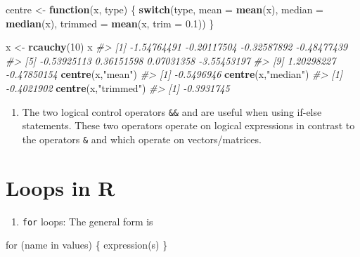 \documentclass[
]{book}
\newenvironment{Shaded}{\begin{snugshade}}{\end{snugshade}}
\newcommand{\AttributeTok}[1]{\textcolor[rgb]{0.13,0.29,0.53}{#1}}
\newcommand{\CommentTok}[1]{\textcolor[rgb]{0.56,0.35,0.01}{\textit{#1}}}
\newcommand{\ControlFlowTok}[1]{\textcolor[rgb]{0.13,0.29,0.53}{\textbf{#1}}}
\newcommand{\DecValTok}[1]{\textcolor[rgb]{0.00,0.00,0.81}{#1}}
\newcommand{\FloatTok}[1]{\textcolor[rgb]{0.00,0.00,0.81}{#1}}
\newcommand{\FunctionTok}[1]{\textcolor[rgb]{0.13,0.29,0.53}{\textbf{#1}}}
\newcommand{\NormalTok}[1]{#1}
\newcommand{\OtherTok}[1]{\textcolor[rgb]{0.56,0.35,0.01}{#1}}
\newcommand{\StringTok}[1]{\textcolor[rgb]{0.31,0.60,0.02}{#1}}
\providecommand{\tightlist}{%
  \setlength{\itemsep}{0pt}\setlength{\parskip}{0pt}}
\begin{document}
\begin{Shaded}
\begin{Highlighting}[]
\NormalTok{centre }\OtherTok{\textless{}{-}} \ControlFlowTok{function}\NormalTok{(x, type) }
\NormalTok{  \{ }\ControlFlowTok{switch}\NormalTok{(type,}
           \AttributeTok{mean =} \FunctionTok{mean}\NormalTok{(x),}
           \AttributeTok{median =} \FunctionTok{median}\NormalTok{(x),}
           \AttributeTok{trimmed =} \FunctionTok{mean}\NormalTok{(x, }\AttributeTok{trim =} \FloatTok{0.1}\NormalTok{))}
\NormalTok{  \}}

\NormalTok{x }\OtherTok{\textless{}{-}} \FunctionTok{rcauchy}\NormalTok{(}\DecValTok{10}\NormalTok{)}
\NormalTok{x}
\CommentTok{\#\textgreater{}  [1] {-}1.54764491 {-}0.20117504 {-}0.32587892 {-}0.48477439}
\CommentTok{\#\textgreater{}  [5] {-}0.53925113  0.36151598  0.07031358 {-}3.55453197}
\CommentTok{\#\textgreater{}  [9]  1.20298227 {-}0.47850154}
\FunctionTok{centre}\NormalTok{(x,}\StringTok{"mean"}\NormalTok{)}
\CommentTok{\#\textgreater{} [1] {-}0.5496946}
\FunctionTok{centre}\NormalTok{(x,}\StringTok{"median"}\NormalTok{)}
\CommentTok{\#\textgreater{} [1] {-}0.4021902}
\FunctionTok{centre}\NormalTok{(x,}\StringTok{"trimmed"}\NormalTok{)}
\CommentTok{\#\textgreater{} [1] {-}0.3931745}
\end{Highlighting}
\end{Shaded}

\begin{enumerate}
\def\labelenumi{(\alph{enumi})}
\setcounter{enumi}{7}
\tightlist
\item
  The two logical control operators \texttt{\&\&} and \texttt{\textbar{}\textbar{}} are useful when using if-else statements. These two operators operate on logical expressions in contrast to the operators \texttt{\&} and \texttt{\textbar{}} which operate on vectors/matrices.
\end{enumerate}

\section{Loops in R}\label{loops-in-r}

\begin{enumerate}
\def\labelenumi{(\alph{enumi})}
\tightlist
\item
  \texttt{for} loops: The general form is
\end{enumerate}

\begin{Shaded}
\begin{Highlighting}[]
\NormalTok{for (name in values)}
\NormalTok{      \{ expression(s)}
\NormalTok{      \}}
\end{Highlighting}
\end{Shaded}
\end{document}
